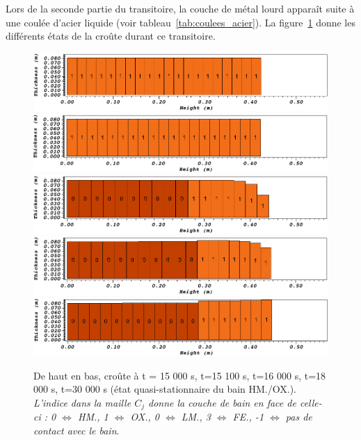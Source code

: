 Lors de la seconde partie du transitoire, la couche de métal lourd apparaît suite à une coulée d'acier liquide (voir tableau~\ref{tab:coulees_acier}). La figure~\ref{fig:croutes_2} donne les différents états de la croûte durant ce transitoire.
\begin{figure}
\centering
\includegraphics[width=\textwidth, keepaspectratio=true]{Figures/croute_1.png}\\
\includegraphics[width=\textwidth, keepaspectratio=true]{Figures/croute_2.png}\\
\includegraphics[width=\textwidth, keepaspectratio=true]{Figures/croute_3.png}\\
\includegraphics[width=\textwidth, keepaspectratio=true]{Figures/croute_4.png}\\
\includegraphics[width=\textwidth, keepaspectratio=true]{Figures/croute_5.png}\\
\caption{De haut en bas, croûte à t = 15 000 s, t=15 100 s, t=16 000 s, t=18 000 s, t=30 000 s (état quasi-stationnaire du bain HM./OX.). \textit{L'indice dans la maille $C_j$ donne la couche de bain en face de celle-ci : 0 $\Leftrightarrow$ HM., 1 $\Leftrightarrow$ OX., 0 $\Leftrightarrow$ LM., 3 $\Leftrightarrow$ FE., -1 $\Leftrightarrow$ pas de contact avec le bain}.}
\label{fig:croutes_2}
\end{figure}
